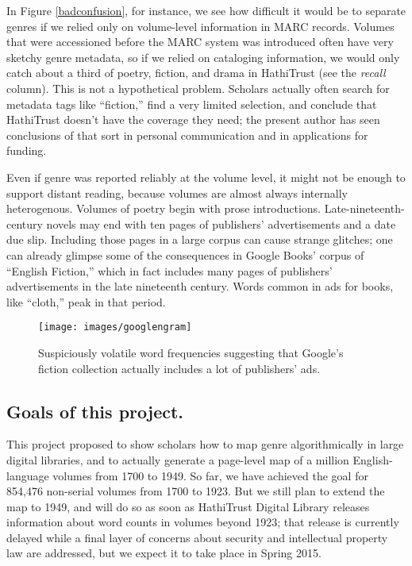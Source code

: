 \documentclass[paper=a4, fontsize=12pt]{scrartcl}
\numberwithin{equation}{section}		%
\numberwithin{figure}{section}			%
\numberwithin{table}{section}				%
\begin{document}
In Figure \ref{badconfusion}, for instance, we see how difficult it would be to separate genres if we relied only on volume-level information in MARC records. Volumes that were accessioned before the MARC system was introduced often have very sketchy genre metadata, so if we relied on cataloging information, we would only catch about a third of poetry, fiction, and drama in HathiTrust (see the \textit{recall} column). This is not a hypothetical problem. Scholars actually often search for metadata tags like ``fiction,'' find a very limited selection, and conclude that HathiTrust doesn't have the coverage they need; the present author has seen conclusions of that sort in personal communication and in applications for funding.

\newpage
Even if genre was reported reliably at the volume level, it might not be enough to support distant reading, because volumes are almost always internally heterogenous. Volumes of poetry  begin with prose introductions. Late-nineteenth-century novels may end with ten pages of publishers' advertisements and a date due slip. Including those pages in a large corpus can cause strange glitches; one can already glimpse some of the consequences in Google Books' corpus of ``English Fiction,'' which in fact includes many pages of publishers' advertisements in the late nineteenth century. Words common in ads for books, like ``cloth,'' peak in that period.

\begin{figure}[!h]
\centering
\texttt{[image: images/googlengram]}
\caption{Suspiciously volatile word frequencies suggesting that Google's fiction collection actually includes a lot of publishers' ads.}
\end{figure}

\newpage
\subsection{Goals of this project.}
This project proposed to show scholars how to map genre algorithmically in large digital libraries, and to actually generate a page-level map of a million English-language volumes from 1700 to 1949. So far, we have achieved the goal for 854,476 non-serial volumes from 1700 to 1923. But we still plan to extend the map to 1949, and will do so as soon as HathiTrust Digital Library releases information about word counts in volumes beyond 1923; that release is currently delayed while a final layer of concerns about security and intellectual property law are addressed, but we expect it to take place in Spring 2015.
\end{document}
